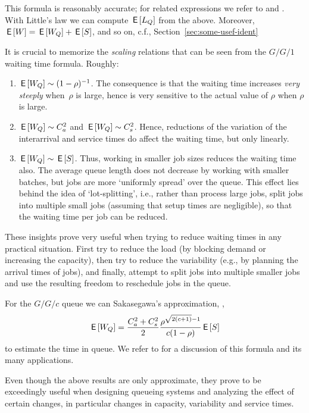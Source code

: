 This formula is reasonably accurate; for related expressions we refer
to \citet{bolch06:_queuein_networ_markov_chain} and
\citet{hall91:_queuein_method_servic_manuf}. With Little's law we can
compute $\,\mathsf{E}\left[L_Q\right]$ from the above. Moreover, $\,\mathsf{E}\left[W\right] = \,\mathsf{E}\left[W_Q\right] + \,\mathsf{E}\left[S\right]$,
and so on, c.f., Section~\ref{sec:some-usef-ident}



It is crucial to memorize the \emph{scaling} relations that can be
seen from the $G/G/1$ waiting time formula. Roughly:
\begin{enumerate}
\item $\,\mathsf{E}\left[W_Q\right] \sim (1-\rho)^{-1}$. The consequence is that the waiting
  time increases \emph{very steeply} when~$\rho$ is large, hence is
  very sensitive to the actual value of $\rho$ when $\rho$ is large.
\item $\,\mathsf{E}\left[W_Q\right] \sim C_a^2$ and $\,\mathsf{E}\left[W_Q\right] \sim C_s^2$. Hence, reductions
  of the variation of the interarrival and service times do affect the
  waiting time, but only linearly.
\item $\,\mathsf{E}\left[W_Q\right] \sim \,\mathsf{E}\left[S\right]$. Thus, working in smaller job sizes reduces
  the waiting time also. The average queue length does not decrease by
  working with smaller batches, but jobs are more `uniformly spread'
  over the queue. This effect lies behind the idea of
  `lot-splitting', i.e., rather than process large jobs, split jobs
  into multiple small jobs (assuming that setup times are negligible),
  so that the waiting time per job can be reduced.
\end{enumerate}

These insights prove very useful when trying to reduce waiting times
in any practical situation. First try to reduce the load (by blocking
demand or increasing the capacity), then try to reduce the variability
(e.g., by planning the arrival times of jobs), and finally, attempt to
split jobs into multiple smaller jobs and use the resulting freedom to
reschedule jobs in the queue.

For the $G/G/c$ queue we can Sakasegawa's approximation, \cite{sakasegawa77:_l}, 
\begin{equation}\label{eq:7}
  \,\mathsf{E}\left[W_Q\right] = \frac{C_a^2+C_s^2}2 \frac{\rho^{\sqrt{2(c+1)}-1}}{c(1-\rho)} \,\mathsf{E}\left[S\right]
\end{equation}
to estimate the time in queue.  We refer to \cite{hopp08:_factor_physic} for a discussion of this formula and its many applications.


Even though the above results are only approximate, they prove to be
exceedingly useful when designing queueing systems and analyzing the
effect of certain changes, in particular  changes in capacity,
variability and service times.


